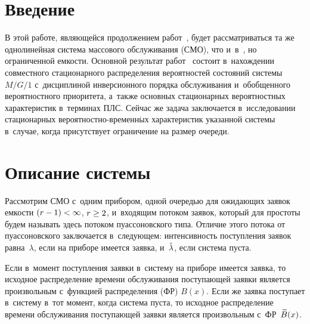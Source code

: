 
\vspace*{6pt}


\thispagestyle{headings}

\begin{multicols}{2}

\label{st\stat}

\section{Введение}

В этой работе, являющейся продолжением работ~\cite{n1, n2}, будет
рассматриваться та же однолинейная система
массового обслуживания (СМО), что и~в~\cite{n1}, но ограниченной емкости.
Основной результат работ~\cite{n1, n2} состоит в~нахождении
совместного стационарного распределения вероятностей состояний %
системы
$M/G/1$ с~дисциплиной инверсионного %
порядка
обслуживания и~обобщенного вероятностного приоритета, а~также основных
стационарных вероятностных характеристик в~терминах ПЛС. %
Сейчас же задача заключается в~исследовании стационарных 
ве\-ро\-ят\-ност\-но-вре\-мен\-н$\acute{\mbox{ы}}$х характеристик указанной системы
в~случае, когда присутствует ограничение на размер очереди.

\vspace*{-4pt}

\section{Описание системы}

Рассмотрим СМО
с~одним прибором,
одной очередью для ожидающих заявок емкости $(r\hm-1)\hm<\infty$, $r \hm\ge 2$,
и~входящим потоком заявок, который для простоты будем называть здесь
потоком пуассоновского типа. Отличие этого потока от пуассоновского
заключается в~следующем: интенсивность поступления заявок равна~$\lambda$,
если на приборе имеется заявка, и~$\tilde\lambda$, если система пуста.


Если в~момент поступления заявки в~систему
на приборе имеется заявка, то исходное распределение времени обслуживания поступающей
заявки является произвольным с~функцией распределения (ФР) $B(x)$.
Если же заявка поступает в~систему в~тот момент, когда система пуста, то исходное
распределение времени обслуживания поступающей
заявки является произвольным с~ФР~$\widetilde B(x)$.


\end{multicols}
